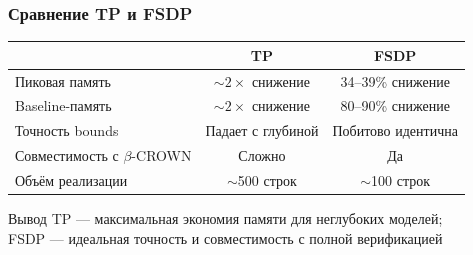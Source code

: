 \begin{frame}
\frametitle{Сравнение TP и FSDP}

\begin{table}[h]
\centering
\small
\begin{tabular}{|l|c|c|}
\hline
& \textbf{TP} & \textbf{FSDP} \\
\hline
Пиковая память & $\sim\!2\times$ снижение & 34--39\% снижение \\
\hline
Baseline-память & $\sim\!2\times$ снижение & 80--90\% снижение \\
\hline
Точность bounds & Падает с глубиной & Побитово идентична \\
\hline
Совместимость с $\beta$-CROWN & Сложно & Да \\
\hline
Объём реализации & $\sim$500 строк & $\sim$100 строк \\
\hline
\end{tabular}
\end{table}

\vspace{0.3cm}

\begin{block}{Вывод}
TP --- максимальная экономия памяти для неглубоких моделей; \\
FSDP --- идеальная точность и совместимость с полной верификацией
\end{block}

\end{frame}